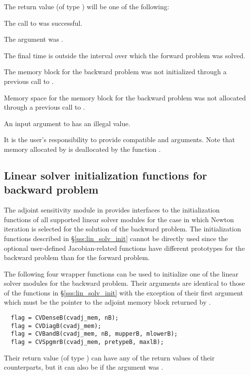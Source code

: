 {
  The return value  (of type ) will be one of the following:
  \begin{args}
  \item[\Id{CV\_SUCCESS}]
    The call to  was successful.
  \item[\Id{CV\_ADJMEM\_NULL}]
    The  argument was .
  \item[\Id{CV\_BAD\_TB0}]
    The final time  is outside the interval over which the forward problem
    was solved.
  \item[\Id{CV\_MEM\_NULL}] 
    The {\cvodes} memory block for the backward problem was not initialized through a 
    previous call to .
  \item[\Id{CV\_NO\_MALLOC}] 
    Memory space for the {\cvodes} memory block for the backward problem was not 
    allocated through a previous call to .
  \item[\Id{CV\_ILL\_INPUT}] 
    An input argument to  has an illegal value.
  \end{args}
}
{
  {\warn} It is the user's responsibility to provide compatible  and
   arguments.
}
Note that memory allocated by  is deallocated by the function 
.

\subsection{Linear solver initialization functions for backward problem}
\label{sss:lin_solv_b}

The adjoint sensitivity module in {\cvodes} provides interfaces to the initialization
functions of all supported linear solver modules for the case in which Newton
iteration is selected for the solution of the backward problem. The initialization
functions described in \S\ref{sss:lin_solv_init} cannot be directly used since the
optional user-defined Jacobian-related functions have different prototypes for the
backward problem than for the forward problem.

The following four wrapper functions can be used to initialize one of the linear
solver modules for the backward problem. Their arguments are identical to those
of the functions in \S\ref{sss:lin_solv_init} with the exception of their first
argument which must be the pointer to the adjoint memory block returned by
.
\begin{verbatim}
  flag = CVDenseB(cvadj_mem, nB);
  flag = CVDiagB(cvadj_mem);
  flag = CVBandB(cvadj_mem, nB, mupperB, mlowerB);
  flag = CVSpgmrB(cvadj_mem, pretypeB, maxlB);
\end{verbatim}
Their return value  (of type ) can have any of the return values 
of their counterparts, but it can also be  if the  
argument was . 


